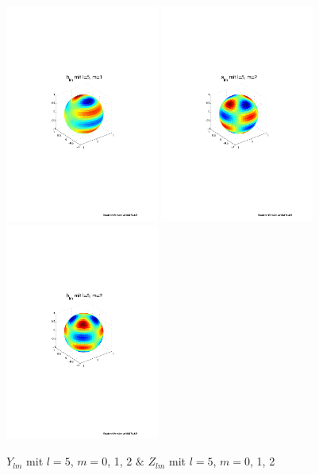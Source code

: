 \begin{refsection}
\begin{figure}
\includegraphics[width=0.45\textwidth]{kugel/ylm/b_5_1.pdf}
\includegraphics[width=0.45\textwidth]{kugel/ylm/a_5_2.pdf}
\includegraphics[width=0.45\textwidth]{kugel/ylm/b_5_2.pdf}
\caption{$Y_{lm}$ mit $l=5$, $m=0$, 1, 2 $\&$ $Z_{lm}$ mit $l=5$, $m=0$, 1, 2
\label{skript:Bild 0}}
\end{figure}


\end{refsection}
